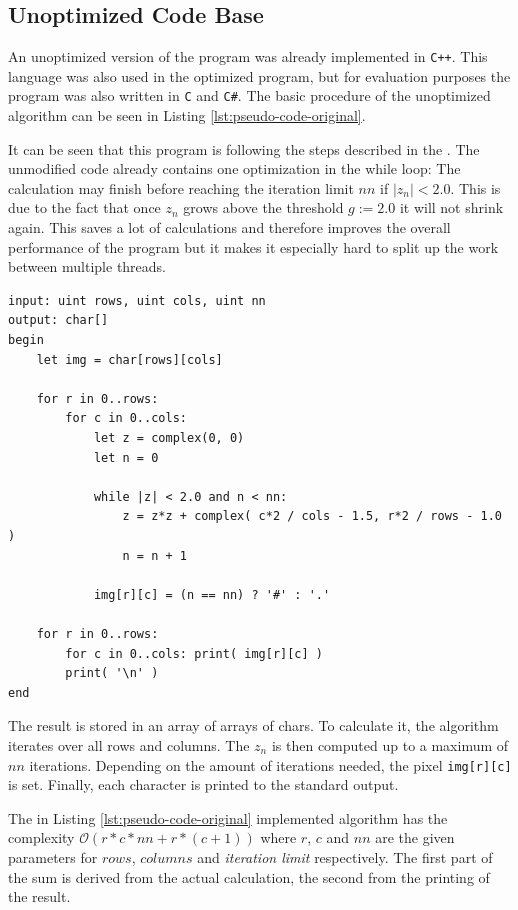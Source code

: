 \subsection{Unoptimized Code Base}
\label{ssec:code-base}

An unoptimized version of the program was already implemented in \verb|C++|. This language was also used in the optimized program, but for evaluation purposes the program was also written in \verb|C| and \verb|C#|. The basic procedure of the unoptimized algorithm can be seen in Listing \ref{lst:pseudo-code-original}.

\noindent It can be seen that this program is following the steps described in the . The unmodified code already contains one optimization in the while loop: The calculation may finish before reaching the iteration limit $nn$ if $|z_n| < 2.0$. This is due to the fact that once $z_n$ grows above the threshold $g := 2.0$ it will not shrink again. This saves a lot of calculations and therefore improves the overall performance of the program but it makes it especially hard to split up the work between multiple threads.

\begin{lstlisting}[caption={Pseudo code of the unoptimized algorithm}, label={lst:pseudo-code-original}, captionpos=b, frame=tb, float]
input: uint rows, uint cols, uint nn
output: char[]
begin
    let img = char[rows][cols]
    
    for r in 0..rows:
        for c in 0..cols:
            let z = complex(0, 0)
            let n = 0
            
            while |z| < 2.0 and n < nn:
                z = z*z + complex( c*2 / cols - 1.5, r*2 / rows - 1.0 )
                n = n + 1
            
            img[r][c] = (n == nn) ? '#' : '.'
    
    for r in 0..rows:
        for c in 0..cols: print( img[r][c] )
        print( '\n' )
end
\end{lstlisting}

The result is stored in an array of arrays of chars. To calculate it, the algorithm iterates over all rows and columns. The $z_n$ is then computed up to a maximum of $nn$ iterations. Depending on the amount of iterations needed, the pixel \verb|img[r][c]| is set. Finally, each character is printed to the standard output.

The in Listing \ref{lst:pseudo-code-original} implemented algorithm has the complexity $\mathcal{O}(r*c*nn+r*(c+1))$ where $r$, $c$ and $nn$ are the given parameters for $rows$, $columns$ and \textit{iteration limit} respectively. The first part of the sum is derived from the actual calculation, the second from the printing of the result.



